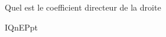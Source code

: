 
\begin{exercice}\label{exosmath-0393}

    Quel est le coefficient directeur de la droite

IQnEPpt

\end{exercice}

